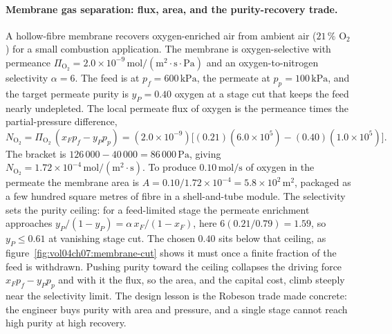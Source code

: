 \paragraph{Membrane gas separation: flux, area, and the purity-recovery
trade.} A hollow-fibre membrane recovers oxygen-enriched air from
ambient air ($21\,\%$ $\text{O}_2$) for a small combustion application. The
membrane is oxygen-selective with permeance $\Pi_{\text{O}_2} = 2.0\times
10^{-9}\,\text{mol}/(\text{m}^2\cdot\text{s}\cdot\text{Pa})$ and an
oxygen-to-nitrogen selectivity $\alpha = 6$. The feed is at
$p_f = 600\,\text{kPa}$, the permeate at $p_p = 100\,\text{kPa}$, and the
target permeate purity is $y_P = 0.40$ oxygen at a stage cut that keeps
the feed nearly undepleted. The local permeate flux of oxygen is the
permeance times the partial-pressure difference,
\[
N_{\text{O}_2} = \Pi_{\text{O}_2}\,(x_F p_f - y_P p_p) =
(2.0\times 10^{-9})\big[(0.21)(6.0\times 10^{5}) - (0.40)(1.0\times
10^{5})\big].
\]
The bracket is $126\,000 - 40\,000 = 86\,000\,\text{Pa}$, giving
$N_{\text{O}_2} = 1.72\times 10^{-4}\,\text{mol}/(\text{m}^2\cdot
\text{s})$. To produce $0.10\,\text{mol/s}$ of oxygen in the permeate
the membrane area is $A = 0.10/1.72\times 10^{-4} = 5.8\times 10^{2}\,
\text{m}^2$, packaged as a few hundred square metres of fibre in a
shell-and-tube module. The selectivity sets the purity ceiling: for a
feed-limited stage the permeate enrichment approaches
$y_P/(1-y_P) = \alpha\,x_F/(1-x_F)$, here $6(0.21/0.79) = 1.59$, so
$y_P \le 0.61$ at vanishing stage cut. The chosen $0.40$ sits below
that ceiling, as figure~\ref{fig:vol04ch07:membrane-cut} shows it must
once a finite fraction of the feed is withdrawn. Pushing purity toward
the ceiling collapses the driving force $x_F p_f - y_P p_p$ and with it
the flux, so the area, and the capital cost, climb steeply near the
selectivity limit. The design lesson is the Robeson trade made concrete:
the engineer buys purity with area and pressure, and a single stage
cannot reach high purity at high recovery.



